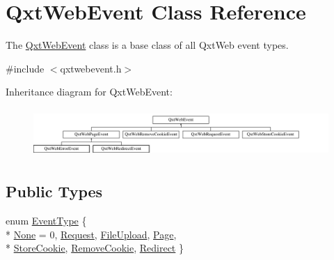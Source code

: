 \hypertarget{class_qxt_web_event}{\section{Qxt\-Web\-Event Class Reference}
\label{class_qxt_web_event}
}


The \hyperlink{class_qxt_web_event}{Qxt\-Web\-Event} class is a base class of all Qxt\-Web event types.  




{\ttfamily \#include $<$qxtwebevent.\-h$>$}

Inheritance diagram for Qxt\-Web\-Event\-:\begin{figure}[H]
\begin{center}
\leavevmode
\includegraphics[height=1.866667cm]{class_qxt_web_event}
\end{center}
\end{figure}
\subsection*{Public Types}
\begin{DoxyCompactItemize}
\item 
enum \hyperlink{class_qxt_web_event_abb938625cf49e454f9840a40f3fc4a3c}{Event\-Type} \{ \\*
\hyperlink{class_qxt_web_event_abb938625cf49e454f9840a40f3fc4a3caac343c552d37622a400803f877498e9b}{None} = 0, 
\hyperlink{class_qxt_web_event_abb938625cf49e454f9840a40f3fc4a3ca064ea2c377394458a1f917421369d6fb}{Request}, 
\hyperlink{class_qxt_web_event_abb938625cf49e454f9840a40f3fc4a3cab38b91814eec9654b6747e3a1f69d5f5}{File\-Upload}, 
\hyperlink{class_qxt_web_event_abb938625cf49e454f9840a40f3fc4a3ca2a6856ad946f8176a0721f707fa2cf2d}{Page}, 
\\*
\hyperlink{class_qxt_web_event_abb938625cf49e454f9840a40f3fc4a3caae266d5ec44da303f3c10c841eb5069a}{Store\-Cookie}, 
\hyperlink{class_qxt_web_event_abb938625cf49e454f9840a40f3fc4a3ca3d92a78939175113778a18ec79aa672e}{Remove\-Cookie}, 
\hyperlink{class_qxt_web_event_abb938625cf49e454f9840a40f3fc4a3ca4d49a95c8fca6972666b95d74de12287}{Redirect}
 \}
\end{DoxyCompactItemize}
